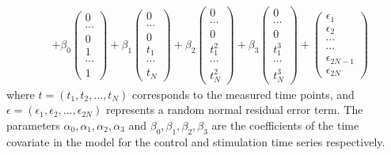 \begin{eqnarray}
%
&+ \beta_0 
\begin{pmatrix}
0\\
\cdots\\
0\\
1\\
\cdots\\
1
\end{pmatrix}
%
+ \beta_1
\begin{pmatrix}
0\\
\cdots\\
0\\
t_1\\
\cdots\\
t_N
\end{pmatrix}
%
+ \beta_2
\begin{pmatrix}
0\\
\cdots\\
0\\
t_1^2\\
\cdots\\
t_N^2
\end{pmatrix}
%
+ \beta_3
\begin{pmatrix}
0\\
\cdots\\
0\\
t_1^3\\
\cdots\\
t_N^3
\end{pmatrix}
%
+ 
\begin{pmatrix}
\epsilon_1\\
\epsilon_2\\
\cdots\\
\cdots\\
\epsilon_{2N-1}\\
\epsilon_{2N}
\end{pmatrix}
\end{eqnarray}
where $t=(t_1,t_2,\dotsc,t_N)$ corresponds to the measured time points, and
$\epsilon = (\epsilon_1,\epsilon_2,\dotsc,\epsilon_{2N})$ represents a random
normal residual error term. The parameters $\alpha_0,\alpha_1,\alpha_2,
\alpha_3$ and $\beta_0,\beta_1,\beta_2,\beta_3$ are the coefficients of the 
time covariate in the model for the control and stimulation time series 
respectively.

